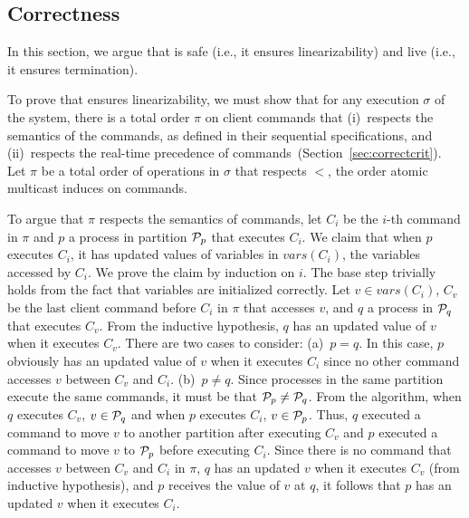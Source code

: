 \subsection{Correctness}
\label{sec:correctness}

\newcommand{\tsc}{\ensuremath{t^{cli}_{start}}}
\newcommand{\tec}{\ensuremath{t^{cli}_{end}}}
\newcommand{\tes}{\ensuremath{t^{srv}_{end}}}
\newcommand{\tss}{\ensuremath{t^{srv}_{start}}}


In this section, we argue that \dynastar is safe (i.e., it ensures linearizability) and live (i.e., it ensures termination).

To prove that \dynastar ensures linearizability, we must show that for any execution $\sigma$ of the system, there is a total order $\pi$ on client commands that 
(i)~respects the semantics of the commands, as defined in their sequential specifications, and 
(ii)~respects the real-time precedence of commands~(Section~\ref{sec:correctcrit}).
%
Let $\pi$ be a total order of operations in $\sigma$ that respects $<$, the order atomic multicast induces on commands.

To argue that $\pi$ respects the semantics of  commands, let $C_i$ be the $i$-th command in $\pi$ and $p$ a process in partition $\mathcal{P}_p$ that executes $C_i$.
We claim that when $p$ executes $C_i$, it has updated values of variables in $vars(C_i)$, the variables accessed by $C_i$.
We prove the claim by induction on $i$.
The base step trivially holds from the fact that variables are initialized correctly.
Let $v \in vars(C_i)$, $C_v$ be the last client command before $C_i$ in $\pi$ that accesses $v$, and $q$ a process in $\mathcal{P}_q$ that executes $C_v$.
From the inductive hypothesis, $q$ has an updated value of $v$ when it executes $C_v$.
There are two cases to consider:
(a)~$p = q$. In this case, $p$ obviously has an updated value of $v$ when it executes $C_i$ since no other command accesses $v$ between $C_v$ and $C_i$.
(b)~$p \neq q$. 
Since processes in the same partition execute the same commands, it must be that $\mathcal{P}_p \neq \mathcal{P}_q$.
From the algorithm, when $q$ executes $C_v$, $v \in \mathcal{P}_q$ and when $p$ executes $C_i$, $v \in \mathcal{P}_p$.
Thus, $q$ executed a command to move $v$ to another partition after executing $C_v$ and $p$ executed a command to move $v$ to $\mathcal{P}_p$ before executing $C_i$.
Since there is no command that accesses $v$ between $C_v$ and $C_i$ in $\pi$, $q$ has an updated $v$ when it executes $C_v$ (from inductive hypothesis), and $p$ receives the value of $v$ at $q$, it follows that $p$ has an updated $v$ when it executes $C_i$.


